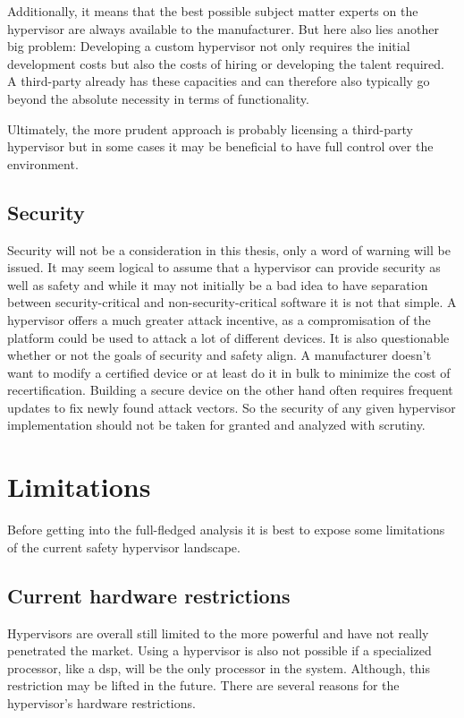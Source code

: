 Additionally, it means that the best possible subject matter experts on the hypervisor are always available to the manufacturer. But here also lies another big problem: Developing a custom hypervisor not only requires the initial development costs but also the costs of hiring or developing the talent required. A third-party already has these capacities and can therefore also typically go beyond the absolute necessity in terms of functionality.

Ultimately, the more prudent approach is probably licensing a third-party hypervisor but in some cases it may be beneficial to have full control over the environment. 

\subsection{Security}
Security will not be a consideration in this thesis, only a word of warning will be issued. It may seem logical to assume that a hypervisor can provide security as well as safety and while it may not initially be a bad idea to have separation between security-critical and non-security-critical software it is not that simple. A hypervisor offers a much greater attack incentive, as a compromisation of the platform could be used to attack a lot of different devices. It is also questionable whether or not the goals of security and safety align. A manufacturer doesn't want to modify a certified device or at least do it in bulk to minimize the cost of recertification. Building a secure device on the other hand often requires frequent updates to fix newly found attack vectors. So the security of any given hypervisor implementation should not be taken for granted and analyzed with scrutiny.

\section{Limitations}
Before getting into the full-fledged analysis it is best to expose some limitations of the current safety hypervisor landscape. 
\subsection{Current hardware restrictions}
Hypervisors are overall still limited to the more powerful  and have not really penetrated the  market. Using a hypervisor is also not possible if a specialized processor, like a \acrfull{dsp}, will be the only processor in the system. Although, this restriction may be lifted in the future.  There are several reasons for the hypervisor's hardware restrictions. 

